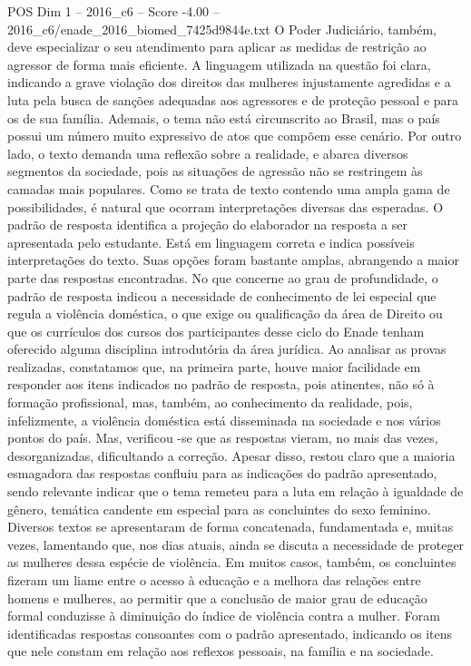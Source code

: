 \begin{textsample}{POS Dim 1 – 2016\_c6 – Score -4.00 – 2016\_c6/enade\_2016\_biomed\_7425d9844e.txt}
O Poder Judiciário, também, deve especializar o seu atendimento para aplicar as medidas de restrição ao agressor de forma mais eficiente.
A linguagem utilizada na questão foi clara, indicando a grave violação dos direitos das mulheres injustamente agredidas e a luta pela busca de sanções adequadas aos agressores e de proteção pessoal e para os de sua família.
Ademais, o tema não está circunscrito ao Brasil, mas o país possui um número muito expressivo de atos que compõem esse cenário.
Por outro lado, o texto demanda uma reflexão sobre a realidade, e abarca diversos segmentos da sociedade, pois as situações de agressão não se restringem às camadas mais populares.
Como se trata de texto contendo uma ampla gama de possibilidades, é natural que ocorram interpretações diversas das esperadas.
O padrão de resposta identifica a projeção do elaborador na resposta a ser apresentada pelo estudante.
Está em linguagem correta e indica possíveis interpretações do texto.
Suas opções foram bastante amplas, abrangendo a maior parte das respostas encontradas.
No que concerne ao grau de profundidade, o padrão de resposta indicou a necessidade de conhecimento de lei especial que regula a violência doméstica, o que exige ou qualificação da área de Direito ou que os currículos dos cursos dos participantes desse ciclo do Enade tenham oferecido alguma disciplina introdutória da área jurídica.
Ao analisar as provas realizadas, constatamos que, na primeira parte, houve maior facilidade em responder aos itens indicados no padrão de resposta, pois atinentes, não só à formação profissional, mas, também, ao conhecimento da realidade, pois, infelizmente, a violência doméstica está disseminada na sociedade e nos vários pontos do país.
Mas, verificou -se que as respostas vieram, no mais das vezes, desorganizadas, dificultando a correção.
Apesar disso, restou claro que a maioria esmagadora das respostas confluiu para as indicações do padrão apresentado, sendo relevante indicar que o tema remeteu para a luta em relação à igualdade de gênero, temática candente em especial para as concluintes do sexo feminino.
Diversos textos se apresentaram de forma concatenada, fundamentada e, muitas vezes, lamentando que, nos dias atuais, ainda se discuta a necessidade de proteger as mulheres dessa espécie de violência.
Em muitos casos, também, os concluintes fizeram um liame entre o acesso à educação e a melhora das relações entre homens e mulheres, ao permitir que a conclusão de maior grau de educação formal conduzisse à diminuição do índice de violência contra a mulher.
Foram identificadas respostas consoantes com o padrão apresentado, indicando os itens que nele constam em relação aos reflexos pessoais, na família e na sociedade.

\end{textsample}
